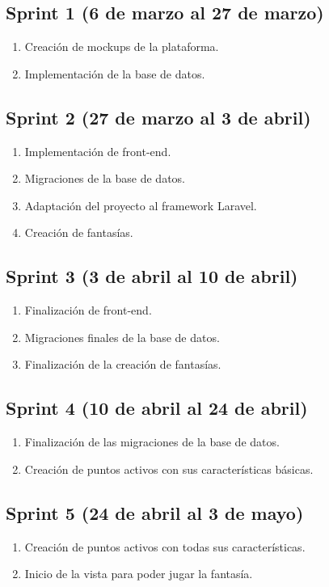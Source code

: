 \subsection{Sprint 1 (6 de marzo al 27 de marzo)}
\begin{enumerate}
	\item Creación de mockups de la plataforma.
	\item Implementación de la base de datos.
\end{enumerate}

\subsection{Sprint 2 (27 de marzo al 3 de abril)}
\begin{enumerate}
	\item Implementación de front-end.
	\item Migraciones de la base de datos.
	\item Adaptación del proyecto al framework Laravel.
	\item Creación de fantasías.
\end{enumerate}

\subsection{Sprint 3 (3 de abril al 10 de abril)}
\begin{enumerate}
	\item Finalización de front-end.
	\item Migraciones finales de la base de datos.
	\item Finalización de la creación de fantasías.
\end{enumerate}

\subsection{Sprint 4 (10 de abril al 24 de abril)}
\begin{enumerate}
	\item Finalización de las migraciones de la base de datos.
	\item Creación de puntos activos con sus características básicas.
\end{enumerate}

\subsection{Sprint 5 (24 de abril al 3 de mayo)}
\begin{enumerate}
	\item Creación de puntos activos con todas sus características.
	\item Inicio de la vista para poder jugar la fantasía.
\end{enumerate}

